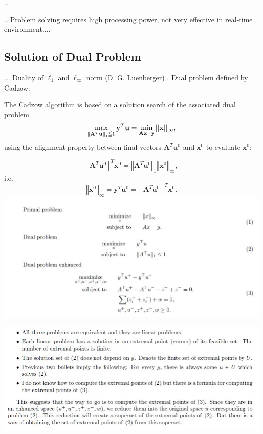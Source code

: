 \documentclass[journal]{IEEEtranTIE}
\begin{document}
...

...Problem solving requires high processing power, not very effective
in real-time environment....

\subsection{Solution of Dual Problem}

... Duality of $\ell_{1}$ and $\ell_{\infty}$ norm (D. G. Luenberger)
\cite{Luenberger1997optimization}. Dual problem defined by Cadzow:

The Cadzow algorithm \cite{Cadzow1973,Cadzow1974efficient} is based
on a solution search of the associated dual problem 
\begin{equation}
\max_{\left\Vert \mathbf{A}^{T}\mathbf{u}\right\Vert _{1}\leqq1}\mathbf{y}^{T}\mathbf{u}=\min_{\mathbf{Ax}=\mathbf{y}}||\mathbf{x}||_{\text{\ensuremath{\infty}}},\label{eq:6}
\end{equation}
using the alignment property between final vectors $\mathbf{A}^{T}\mathbf{u}^{0}$
and $\mathbf{x}^{0}$ to evaluate $\mathbf{x}^{0}$:

\begin{equation}
\left[\mathbf{A}^{T}\mathbf{u}^{0}\right]^{T}\mathbf{x}^{0}=\left\Vert \mathbf{A}^{T}\mathbf{u}^{0}\right\Vert _{1}\left\Vert \mathbf{x}^{0}\right\Vert _{\infty},
\end{equation}
i.e. 
\begin{equation}
\left\Vert \mathbf{x}^{0}\right\Vert _{\infty}=\mathbf{y}^{T}\mathbf{u}^{0}=\left[\mathbf{A}^{T}\mathbf{u}^{0}\right]^{T}\mathbf{x}^{0}.
\end{equation}
\includegraphics[width=0.9\columnwidth]{Figures/temp5}

\includegraphics[width=0.9\columnwidth]{Figures/temp6}
\end{document}
